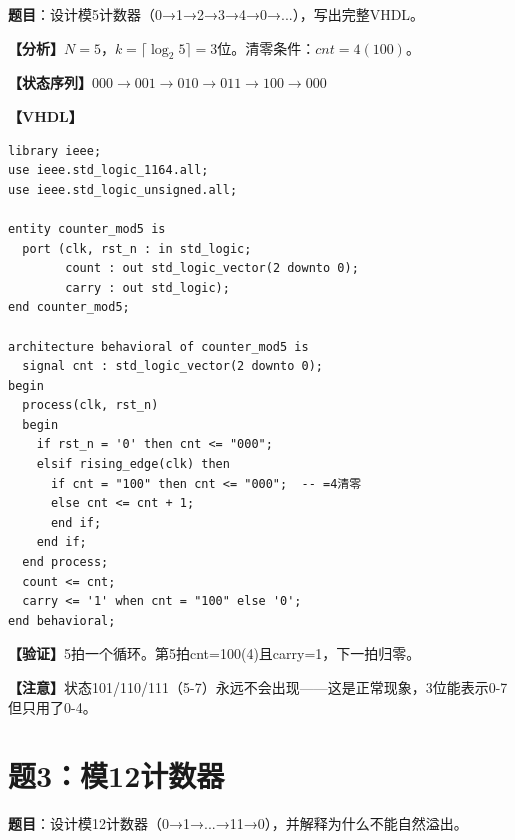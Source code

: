 \textbf{题目}：设计模5计数器（0→1→2→3→4→0→...），写出完整VHDL。

\begin{solution}[完整解答]

\textbf{【分析】}$N=5$，$k=\lceil\log_2 5\rceil=3$位。清零条件：$cnt=4(100)$。

\textbf{【状态序列】}$000 \to 001 \to 010 \to 011 \to 100 \to 000$

\textbf{【VHDL】}
\begin{lstlisting}
library ieee;
use ieee.std_logic_1164.all;
use ieee.std_logic_unsigned.all;

entity counter_mod5 is
  port (clk, rst_n : in std_logic;
        count : out std_logic_vector(2 downto 0);
        carry : out std_logic);
end counter_mod5;

architecture behavioral of counter_mod5 is
  signal cnt : std_logic_vector(2 downto 0);
begin
  process(clk, rst_n)
  begin
    if rst_n = '0' then cnt <= "000";
    elsif rising_edge(clk) then
      if cnt = "100" then cnt <= "000";  -- =4清零
      else cnt <= cnt + 1;
      end if;
    end if;
  end process;
  count <= cnt;
  carry <= '1' when cnt = "100" else '0';
end behavioral;
\end{lstlisting}

\textbf{【验证】}5拍一个循环。第5拍cnt=100(4)且carry=1，下一拍归零。

\textbf{【注意】}状态101/110/111（5-7）永远不会出现——这是正常现象，3位能表示0-7但只用了0-4。

\end{solution}


\section{题3：模12计数器}

\textbf{题目}：设计模12计数器（0→1→...→11→0），并解释为什么不能自然溢出。

